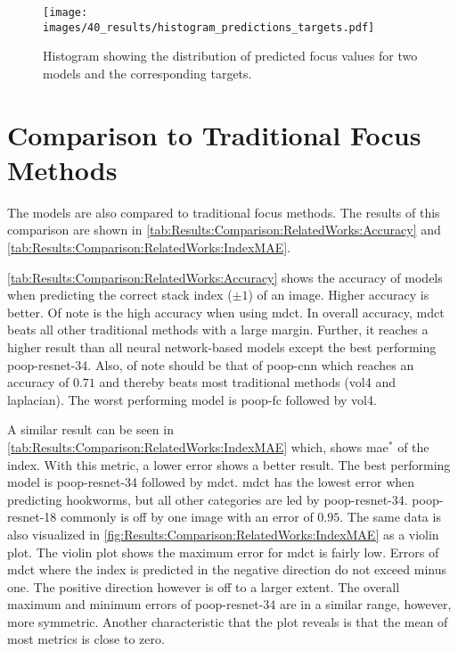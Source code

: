 \begin{figure}
    \centering
    \texttt{[image: images/40\_results/histogram\_predictions\_targets.pdf]}
    \caption[Distribution of predictions]{Histogram showing the distribution of predicted focus values for two models and the corresponding targets.}
    \label{fig:Results:HistogramPredictedTarget}
\end{figure}


\FloatBarrier

\section{Comparison to Traditional Focus Methods}
\label{sec:Results:TraditionalFocusMethods}

The models are also compared to traditional focus methods. The results of this comparison are shown in \autoref{tab:Results:Comparison:RelatedWorks:Accuracy} and \autoref{tab:Results:Comparison:RelatedWorks:IndexMAE}.

\autoref{tab:Results:Comparison:RelatedWorks:Accuracy} shows the accuracy of models when predicting the correct stack index ($\pm 1$) of an image. Higher accuracy is better. Of note is the high accuracy when using \ac{mdct}. In overall accuracy, \ac{mdct} beats all other traditional methods with a large margin. Further, it reaches a higher result than all neural network-based models except the best performing \acs{poop}-\acs{resnet}-34. Also, of note should be that of \acs{poop}-\acs{cnn} which reaches an accuracy of $0.71$ and thereby beats most traditional methods (\ac{vol4} and \ac{laplacian}). The worst performing model is \acs{poop}-\acs{fc} followed by \ac{vol4}.

A similar result can be seen in \autoref{tab:Results:Comparison:RelatedWorks:IndexMAE} which, shows \ac{mae}$^*$ of the index. With this metric, a lower error shows a better result. The best performing model is \acs{poop}-\acs{resnet}-34 followed by \acs{mdct}. \Acs{mdct} has the lowest error when predicting hookworms, but all other categories are led by \acs{poop}-\acs{resnet}-34. \Acs{poop}-\acs{resnet}-18 commonly is off by one image with an error of $0.95$. The same data is also visualized in \autoref{fig:Results:Comparison:RelatedWorks:IndexMAE} as a violin plot. The violin plot shows the maximum error for \ac{mdct} is fairly low. Errors of \ac{mdct} where the index is predicted in the negative direction do not exceed minus one. The positive direction however is off to a larger extent. The overall maximum and minimum errors of \acs{poop}-\acs{resnet}-34 are in a similar range, however, more symmetric. Another characteristic that the plot reveals is that the mean of most metrics is close to zero.


